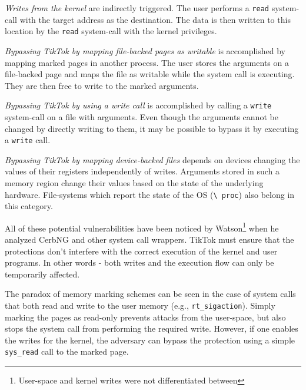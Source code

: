 \emph{Writes from the kernel} are indirectly triggered. The user performs a \texttt{read}
system-call with the target address as the destination. The data is then written
to this location by the \texttt{read} system-call with the kernel privileges.

\emph{Bypassing TikTok by mapping file-backed pages as writable} is accomplished
by mapping marked pages in another process. The user stores the arguments on a
file-backed page and maps the file as writable while the system call is executing.
They are then free to write to the marked arguments.

\emph{Bypassing TikTok by using a write call} is accomplished by calling a
\texttt{write} system-call on a file with arguments. Even though the arguments
cannot be changed by directly writing to them, it may be possible to bypass it
by executing a \texttt{write} call.

\emph{Bypassing TikTok by mapping device-backed files} depends on devices
changing the values of their registers independently of writes. Arguments stored
in such a memory region change their values based on the state of the underlying
hardware. File-systems which report the state of the OS (\texttt{\textbackslash
proc}) also belong in this category.

All of these potential vulnerabilities have been noticed by
Watson\footnote{User-space and kernel writes were not differentiated between}
when he analyzed CerbNG\cite{watson2007exploiting} and other system call
wrappers. TikTok must ensure that the protections don't interfere with the
correct execution of the kernel and user programs. In other words - both writes
and the execution flow can only be temporarily affected.

The paradox of memory marking schemes can be seen in the case of system calls
that both read and write to the user memory (e.g., \texttt{rt\_sigaction}).
Simply marking the pages as read-only prevents attacks from the user-space, but
also stops the system call from performing the required write. However, if one
enables the writes for the kernel, the adversary can bypass the protection
using a simple \texttt{sys\_read} call to the marked page.

